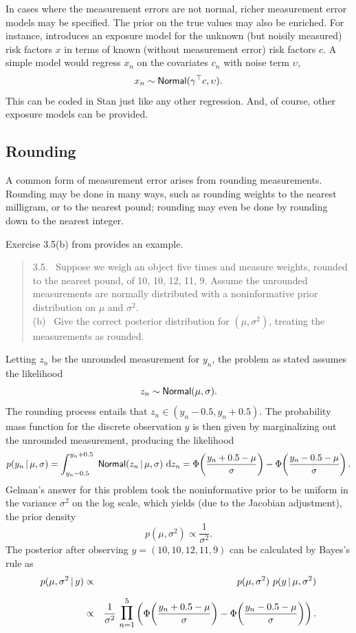 In cases where the measurement errors are not normal, richer
measurement error models may be specified.  The prior on the true
values may also be enriched.  For instance, \citep{Clayton:1992}
introduces an exposure model for the unknown (but noisily measured)
risk factors $x$ in terms of known (without measurement error) risk
factors $c$.  A simple model would regress $x_n$ on the covariates
$c_n$ with noise term $\upsilon$,
\[
x_n \sim \distro{Normal}(\gamma^{\top}c, \upsilon).
\]
This can be coded in Stan just like any other regression.  And, of
course, other exposure models can be provided.


\subsection{Rounding}

A common form of measurement error arises from rounding measurements.
Rounding may be done in many ways, such as rounding weights to the
nearest milligram, or to the nearest pound; rounding may even be done
by rounding down to the nearest integer.  

Exercise 3.5(b) from \citep{GelmanEtAl:2013} provides an example.
%
\begin{quote}
  3.5. \ Suppose we weigh an object five times and measure
  weights, rounded to the nearest pound, of 10, 10, 12, 11, 9.  Assume
  the unrounded measurements are normally distributed with a
  noninformative prior distribution on $\mu$ and $\sigma^2$. 
  \\[4pt]
  (b) \ Give the correct posterior distribution for $(\mu, \sigma^2)$,
  treating the measurements as rounded.
\end{quote}
%
Letting $z_n$ be the unrounded measurement for $y_n$, the problem
as stated assumes the likelihood
%
\[
z_n \sim \distro{Normal}(\mu, \sigma).
\]
%
The rounding process entails that $z_n \in (y_n - 0.5, y_n + 0.5)$.
The probability mass function for the discrete observation $y$ is then given
by marginalizing out the unrounded measurement, producing the likelihood
\[
p(y_n \, | \, \mu, \sigma)
= 
\int_{y_n - 0.5}^{y_n + 0.5}
\
\distro{Normal}(z_n \, | \, \mu, \sigma)
\
\mathrm{d}z_n
= 
\Phi\!\left(\frac{y_n + 0.5 - \mu}{\sigma}\right)
- 
\Phi\!\left(\frac{y_n - 0.5 - \mu}{\sigma}\right).
\]
Gelman's answer for this problem took the noninformative prior to be
uniform in the variance $\sigma^2$ on the log scale, which yields (due
to the Jacobian adjustment), the prior density
\[
p(\mu, \sigma^2) \propto \frac{1}{\sigma^2}.
\]
The posterior after observing $y = (10, 10, 12, 11, 9)$ can be
calculated by Bayes's rule as
%
\begin{eqnarray*}
p(\mu, \sigma^2 \, | \, y)
& \propto &
p(\mu, \sigma^2) \ p(y \, | \, \mu, \sigma^2)
\\[6pt]
&  \propto &
\frac{1}{\sigma^2}
\
\mathlarger{\mathlarger{\prod}}_{n=1}^5 
\left(
\Phi\!\left(\frac{y_n + 0.5 - \mu}{\sigma}\right)
- 
\Phi\!\left(\frac{y_n - 0.5 - \mu}{\sigma}\right)
\right).
\end{eqnarray*}
%

